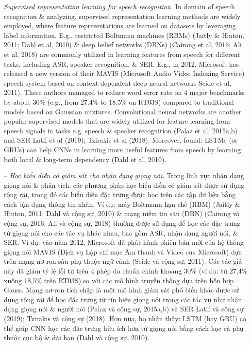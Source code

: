 \documentclass{article}
\begin{document}
\begin{itemize}
\begin{itemize}
\begin{itemize}
            {\it Supervised representation learning for speech recognition.} In domain of speech recognition \& analyzing, supervised representation learning methods are widely employed, where feature representations are learned on datasets by leveraging label information. E.g., restricted Boltmann machines (RBMs) (Jaitly \& Hinton, 2011; Dahl et al, 2010) \& deep belief networks (DBNs) (Cairong et al, 2016; Ali et al, 2018) are commonly utilized in learning features from speech for different tasks, including ASR, speaker recognition, \& SER. E.g., in 2012, Microsoft has released a new version of their MAVIS (Microsoft Audio Video Indexing Service) speech system based on context-dependent deep neural networks Seide et al, 2011). These authors managed to reduce word error rate on 4 major benchmarks by about 30\% (e.g., from 27.4\% to 18.5\% on RT03S) compared to traditional models based on Gaussian mixtures. Convolutional neural networks are another popular supervised models that are widely utilized for feature learning from speech signals in tasks e.g. speech \& speaker recognition (Palaz et al, 2015a,b) and SER Latif et al (2019); Tzirakis et al (2018). Moreover, found: LSTMs (or GRUs) can help CNNs in learning more useful features from speech by learning both local \& long-term dependency (Dahl et al, 2010).

            -- {\it Học biểu diễn có giám sát cho nhận dạng giọng nói.} Trong lĩnh vực nhận dạng giọng nói \& phân tích, các phương pháp học biểu diễn có giám sát được sử dụng rộng rãi, trong đó các biểu diễn đặc trưng được học trên các tập dữ liệu bằng cách tận dụng thông tin nhãn. Ví dụ: máy Boltmann hạn chế (RBM) (Jaitly \& Hinton, 2011; Dahl và cộng sự, 2010) \& mạng niềm tin sâu (DBN) (Cairong và cộng sự, 2016; Ali và cộng sự, 2018) thường được sử dụng để học các đặc trưng từ giọng nói cho các tác vụ khác nhau, bao gồm ASR, nhận dạng người nói, \& SER. Ví dụ: vào năm 2012, Microsoft đã phát hành phiên bản mới của hệ thống giọng nói MAVIS (Dịch vụ Lập chỉ mục Âm thanh và Video của Microsoft) dựa trên mạng nơ-ron sâu phụ thuộc ngữ cảnh (Seide và cộng sự, 2011). Các tác giả này đã giảm tỷ lệ lỗi từ trên 4 phép đo chuẩn chính khoảng 30\% (ví dụ: từ 27,4\% xuống 18,5\% trên RT03S) so với các mô hình truyền thống dựa trên hỗn hợp Gauss. Mạng nơ-ron tích chập là một mô hình giám sát phổ biến khác được sử dụng rộng rãi để học đặc trưng từ tín hiệu giọng nói trong các tác vụ như nhận dạng giọng nói \& người nói (Palaz và cộng sự, 2015a,b) và SER Latif và cộng sự (2019); Tzirakis và cộng sự (2018). Hơn nữa, họ nhận thấy: LSTM (hay GRU) có thể giúp CNN học các đặc trưng hữu ích hơn từ giọng nói bằng cách học cả phụ thuộc cục bộ \& dài hạn (Dahl và cộng sự, 2010).


\end{itemize}
\end{itemize}
\end{itemize}
\end{document}
